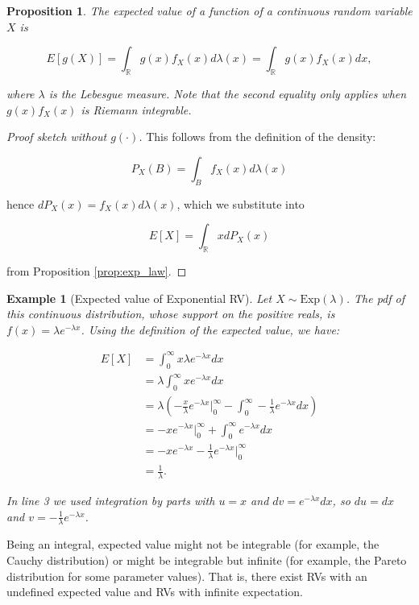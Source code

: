 \documentclass{book}
\theoremstyle{plain}%
\newtheorem{prototheorem}{Example}[section]
\newenvironment{cexample}
   {\colorlet{shadecolor}{gray!10}\begin{shaded}\begin{prototheorem}}
   {\end{prototheorem}\end{shaded}}
\newtheorem{proposition}{Proposition}[section]
\theoremstyle{definition}
\begin{document}
\begin{proposition}
The expected value of a function of a continuous random variable $X$ is

$$E[g(X)] = \int_\mathbb{R} g(x) f_X(x) d\lambda(x) = \int_\mathbb{R} g(x) f_X(x) dx,$$

where $\lambda$ is the Lebesgue measure. Note that the second equality only applies when $g(x)f_X(x)$ is Riemann integrable.
\end{proposition}

\begin{proof}[Proof sketch without $g(\cdot)$]
This follows from the definition of the density:

$$P_X(B) = \int_B f_X(x) d\lambda(x)$$

hence $dP_X(x) = f_X(x) d\lambda(x)$, which we substitute into

$$E[X] = \int_{\mathbb{R}} x dP_X(x)$$

from Proposition \ref{prop:exp_law}.

\end{proof}

\begin{cexample}[Expected value of Exponential RV]
Let $X \sim \text{Exp}(\lambda)$. The pdf of this continuous distribution, whose support on the positive reals, is $f(x) = \lambda e^{-\lambda x}$. Using the definition of the expected value, we have:

\begin{align*}
E[X] &= \int_0^\infty x \lambda e^{-\lambda x} dx \\
&= \lambda \int_0^\infty x e^{-\lambda x} dx \\
&= \lambda\left(-\frac{x}{\lambda}e^{-\lambda x}\bigg\rvert_0^\infty -  \int_0^\infty -\frac{1}{\lambda}e^{-\lambda x} dx\right)\\
&= -xe^{-\lambda x}\bigg\rvert_0^\infty + \int_0^\infty e^{-\lambda x} dx\\
&= -xe^{-\lambda x} -  \frac{1}{\lambda}e^{-\lambda x} \bigg\rvert_0^\infty \\
&= \frac{1}{\lambda}.
\end{align*}

In line 3 we used integration by parts with $u = x$ and $dv = e^{-\lambda x} dx$, so $du = dx$ and $v = -\frac{1}{\lambda}e^{-\lambda x}$. 
\end{cexample}

Being an integral, expected value might not be integrable (for example, the Cauchy distribution) or might be integrable but infinite (for example, the Pareto distribution for some parameter values). That is, there exist RVs with an undefined expected value and RVs with infinite expectation.
\end{document}
